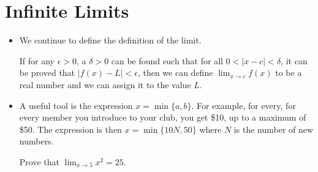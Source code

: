 \section{Infinite Limits}
\begin{itemize}
    \item We continue to define the definition of the limit.
    \begin{definition}
        If for any $\epsilon>0$, a $\delta>0$ can be found such that for all $0<|x-c|<\delta$, it can be proved that $|f(x)-L|<\epsilon$, then we can define $\lim_{x\to c}f(x)$ to be a real number and we can assign it to the value $L$.
    \end{definition}
    \item A useful tool is the expression $x=\min\{a,b\}$. For example, for every, for every member you introduce to your club, you get \$10, up to a maximum of \$50. The expression is then $x=\min\{10N,50\}$ where $N$ is the number of new numbers.
    \begin{example}
        Prove that $\displaystyle\lim_{x\to 5}x^2=25$.


\end{example}
\end{itemize}
